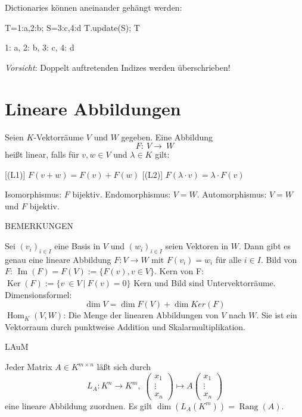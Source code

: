 \documentclass[fontsize=12pt,paper=a4,twoside,bibtotoc,idxtotoc,
liststotoc,pagesize,BCOR1.2cm,DIV15,chapterprefix,pagesize=pdftex]{scrbook}
\theoremstyle{plain}
\theoremstyle{definition}
\theoremstyle{remark}
\begin{document}
 Dictionaries können aneinander gehängt werden:
\begin{sagein}
T={1:a,2:b}; S={3:c,4:d}
T.update(S); T
\end{sagein}
\begin{sage}
{1: a, 2: b, 3: c, 4: d}
\end{sage}
\emph{Vorsicht}: Doppelt auftretenden Indizes werden überschrieben!


\section{Lineare Abbildungen}
Seien $K$-Vektorräume $V$ und $W$ gegeben. Eine Abbildung
\[ F: \ V \rightarrow \ W \]
heißt {\color{red} linear}, falls für $v,w\in V$ und $\lambda \in K$ gilt:

 [(L1)] $F(v+w)=F(v)+F(w)$
 [(L2)] $F(\lambda \cdot v)=\lambda \cdot F(v)$
 

  {\color{red} Isomorphismus}: $F$ bijektiv. 
 {\color{red} Endomorphismus}: $V=W$.
 {\color{red} Automorphismus}: $V=W$ und $F$ bijektiv.


BEMERKUNGEN


 Sei $(v_i)_{i\in I}$ eine Basis in $V$ und $(w_i)_{i\in I}$
seien Vektoren in $W$. Dann gibt es genau eine lineare Abbildung $F:V
\rightarrow W$ mit $F(v_i)=w_i$ für alle $i \in I$.
 {\color{red} Bild} von $F$:   $\mathop{Im}(F) = F(V):=\{ F(v), v \in V \}$.
 {\color{red} Kern} von F: $\mathop{Ker}(F):=\{v \ \in V \ | \ F(v)=0 \}$
 Kern und Bild sind Untervektorräume.
 Dimensionsformel:
\[\dim V = \dim F(V) + \dim Ker(F)\]
 {\color{red} $\operatorname{Hom}_K(V,W)$}: Die Menge der linearen Abbildungen von $V$ nach $W$. 
Sie ist ein Vektorraum durch punktweise Addition und Skalarmultiplikation.


LAuM


 Jeder Matrix $A \in K^{m \times n}$ läßt sich durch 
\[
 L_A: K^n \rightarrow K^m,\; 
\begin{pmatrix}
 x_1\\
\vdots\\
x_n
\end{pmatrix}
\longmapsto
A
\begin{pmatrix}
 x_1\\
\vdots\\
x_n
\end{pmatrix}
\]
eine lineare Abbildung zuordnen.
 Es gilt $\operatorname{dim}(L_A(K^m))=\operatorname{Rang}(A)$.
\end{document}
